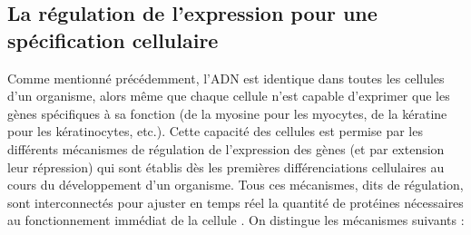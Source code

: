 \subsection{La régulation de l'expression pour une spécification cellulaire}

Comme mentionné précédemment, l'ADN est identique dans toutes les cellules d'un organisme, alors même que chaque cellule n'est capable d'exprimer que les gènes spécifiques à sa fonction (de la myosine pour les myocytes, de la kératine pour les kératinocytes, etc.). Cette capacité des cellules est permise par les différents mécanismes de régulation de l'expression des gènes (et par extension leur répression) qui sont établis dès les premières différenciations cellulaires au cours du développement d'un organisme. Tous ces mécanismes, dits de régulation, sont interconnectés pour ajuster en temps réel la quantité de protéines nécessaires au fonctionnement immédiat de la cellule \cite{Weake2010Jun}. On distingue les mécanismes suivants : 
